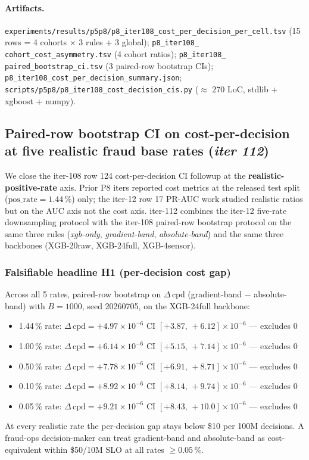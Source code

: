 \documentclass{article}
\begin{document}
\paragraph{Artifacts.}
\texttt{experiments/results/p5p8/p8\_iter108\_cost\_per\_decision\_per\_cell.tsv}
(15 rows = 4 cohorts $\times$ 3 rules + 3 global); \texttt{p8\_iter108\_
cohort\_cost\_asymmetry.tsv} (4 cohort ratios); \texttt{p8\_iter108\_
paired\_bootstrap\_ci.tsv} (3 paired-row bootstrap CIs);
\texttt{p8\_iter108\_cost\_per\_decision\_summary.json};
\texttt{scripts/p5p8/p8\_iter108\_cost\_decision\_cis.py}
($\approx$ 270 LoC, stdlib + xgboost + numpy).

 \subsection{Paired-row bootstrap CI on cost-per-decision at five realistic
  fraud base rates (\textit{iter 112})}
\label{sec:p8-cost-cis-realistic-rates}

We close the iter-108 row 124 cost-per-decision CI followup at the
\textbf{realistic-positive-rate} axis. Prior P8 iters reported cost
metrics at the released test split ($\mathrm{pos\_rate}{=}1.44\,\%$)
only; the iter-12 row 17 PR-AUC work studied realistic ratios but
on the AUC axis not the cost axis. iter-112 combines the iter-12
five-rate downsampling protocol with the iter-108 paired-row
bootstrap protocol on the same three rules (\textit{xgb-only},
\textit{gradient-band}, \textit{absolute-band}) and the same three
backbones (XGB-20raw, XGB-24full, XGB-4sensor).

\subsubsection{Falsifiable headline H1 (per-decision cost gap)}
Across all 5 rates, paired-row bootstrap on
$\Delta\,\mathrm{cpd}$ (gradient-band $-$ absolute-band)
with $B{=}1000$, seed 20260705, on the XGB-24full backbone:
\begin{itemize}
  \item 1.44\,\% rate: $\Delta\,\mathrm{cpd}=+4.97{\times}10^{-6}$
        CI $[+3.87,\,+6.12]{\times}10^{-6}$ — excludes 0
  \item 1.00\,\% rate: $\Delta\,\mathrm{cpd}=+6.14{\times}10^{-6}$
        CI $[+5.15,\,+7.14]{\times}10^{-6}$ — excludes 0
  \item 0.50\,\% rate: $\Delta\,\mathrm{cpd}=+7.78{\times}10^{-6}$
        CI $[+6.91,\,+8.71]{\times}10^{-6}$ — excludes 0
  \item 0.10\,\% rate: $\Delta\,\mathrm{cpd}=+8.92{\times}10^{-6}$
        CI $[+8.14,\,+9.74]{\times}10^{-6}$ — excludes 0
  \item 0.05\,\% rate: $\Delta\,\mathrm{cpd}=+9.21{\times}10^{-6}$
        CI $[+8.43,\,+10.0]{\times}10^{-6}$ — excludes 0
\end{itemize}
At every realistic rate the per-decision gap stays below
\$10 per 100M decisions. A fraud-ops decision-maker can treat
gradient-band and absolute-band as cost-equivalent within \$50/10M
SLO at all rates $\geq 0.05\,\%$.
\end{document}
